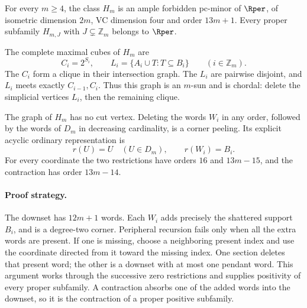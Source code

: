 \begin{theorem}
\label{thm:rper-chordal-sun-obstructions}
For every $m\ge4$, the class $H_m$ is an ample forbidden pc-minor of
$\Rper$, of isometric dimension $2m$, VC dimension four and order $13m+1$.
Every proper subfamily $H_{m,J}$ with $J\subsetneq\mathbb Z_m$ belongs
to $\Rper$.

The complete maximal cubes of $H_m$ are
\[
 C_i=2^{S_i},\qquad
 L_i=\{A_i\cup T:T\subseteq B_i\}\qquad(i\in\mathbb Z_m).
\]
The $C_i$ form a clique in their intersection graph. The $L_i$ are
pairwise disjoint, and $L_i$ meets exactly $C_{i-1},C_i$.
Thus this graph is an $m$-sun and is chordal: delete the simplicial
vertices $L_i$, then the remaining clique.

The graph of $H_m$ has no cut vertex. Deleting the words $W_i$ in any
order, followed by the words of $D_m$ in decreasing cardinality, is a
corner peeling. Its explicit acyclic ordinary representation is
\begin{equation}
 r(U)=U\quad(U\in D_m),\qquad r(W_i)=B_i.
 \label{eq:rper-sun-representation}
\end{equation}
For every coordinate the two restrictions have orders $16$ and $13m-15$,
and the contraction has order $13m-14$.
\end{theorem}

\paragraph{Proof strategy.}
The downset has $12m+1$ words. Each $W_i$ adds precisely the shattered
support $B_i$, and is a degree-two corner. Peripheral recursion fails
only when all the extra words are present. If one is missing, choose a
neighboring present index and use the coordinate directed from it toward
the missing index. One section deletes that present word; the other is a
downset with at most one pendant word. This argument works through the
successive zero restrictions and supplies positivity of every proper
subfamily. A contraction absorbs one of the added words into the downset,
so it is the contraction of a proper positive subfamily.

